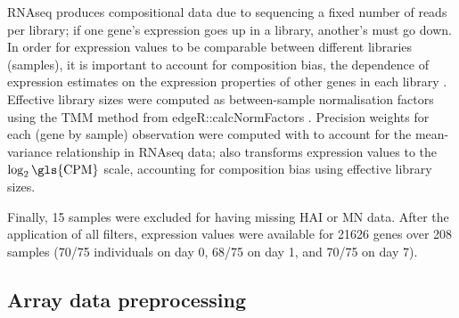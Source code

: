 %
\gls{RNAseq} produces compositional data due to sequencing a fixed number of reads per library; if one gene's expression goes up in a library, another's must go down.
In order for expression values to be comparable between different libraries (samples), it is important to account for composition bias, the dependence of expression estimates on the expression properties of other genes in each library \autocite{robinson2010ScalingNormalizationMethod}.
Effective library sizes were computed as between-sample normalisation factors using the \gls{TMM} method \autocite{robinson2010ScalingNormalizationMethod,evans2018SelectingBetweensampleRNASeq} from edgeR::calcNormFactors \autocite{robinson2010EdgeRBioconductorPackage}.
Precision weights for each (gene by sample) observation were computed with  \autocite{law2014VoomPrecisionWeights} to account for the mean-variance relationship in \gls{RNAseq} data;
 also transforms expression values to the $\log_2{\text{\gls{CPM}}}$ scale, accounting for composition bias using effective library sizes.

Finally, 15 samples were excluded for having missing \gls{HAI} or \gls{MN} data.
After the application of all filters, expression values were available for \num{21626} genes over 208 samples
(70/75 individuals on day 0, 68/75 on day 1, and 70/75 on day 7).

\subsection{Array data preprocessing}
\label{subsec:hird_dge_array_preproc}

